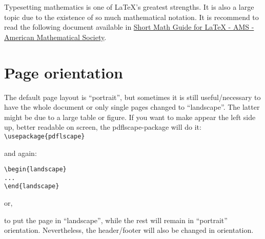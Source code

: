 Typesetting mathematics is one of \LaTeX's greatest strengths. It is also a large topic due to the existence of so much mathematical notation. It is recommend to read the following document available in \href{http://www.google.pt/url?sa=t&rct=j&q=&esrc=s&source=web&cd=1&cad=rja&ved=0CB4QFjAA&url=ftp%3A%2F%2Fftp.ams.org%2Fpub%2Ftex%2Fdoc%2Famsmath%2Fshort-math-guide.pdf&ei=DkScUOm8IJC5hAei7oGQDg&usg=AFQjCNEHl1pXuurNmXAdqfC0z-pPAbDyUw}{Short Math Guide for LaTeX - AMS - American Mathematical Society}.

\section{Page orientation}

\begin{sloppypar}
The default page layout is ``portrait'', but sometimes it is still useful/necessary to have the whole document or only single pages changed to ``landscape''. The latter might be due to a large table or figure. If you want to make appear the left side up, better readable on screen, the pdflscape-package will do it:
\verb|\usepackage{pdflscape}|
\end{sloppypar}
and again:
\begin{verbatim}
\begin{landscape}
...
\end{landscape}
\end{verbatim}

or, 
\verb||

to put the page in ``landscape'', while the rest will remain in ``portrait'' orientation. Nevertheless, the header/footer will also be changed in orientation.


